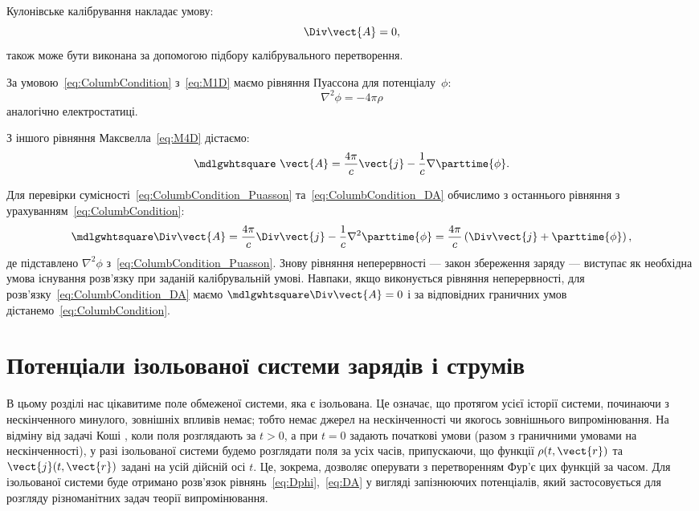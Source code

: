 Кулонівське калібрування накладає умову:
\begin{equation}\label{eq:ColumbCondition}
	\Div \vect{A} = 0,
\end{equation}
також може бути виконана за допомогою підбору калібрувального
перетворення.

За умовою~\eqref{eq:ColumbCondition} з~\eqref{eq:M1D} маємо рівняння Пуассона для потенціалу~$\phi$:
\begin{equation}\label{eq:ColumbCondition_Puasson}
	\nabla^2 \phi = -4\pi \rho
\end{equation}
аналогічно електростатиці.

З іншого рівняння Максвелла~\eqref{eq:M4D} дістаємо:
\begin{equation}\label{eq:ColumbCondition_DA}
	\mdlgwhtsquare\ \vect{A} = \frac{4\pi}c \vect{j} - \frac1c \nabla \parttime{\phi}.
\end{equation}

Для перевірки сумісності~\eqref{eq:ColumbCondition_Puasson} та~\eqref{eq:ColumbCondition_DA} обчислимо з останнього рівняння з
урахуванням~\eqref{eq:ColumbCondition}:
\begin{equation*}
	\mdlgwhtsquare\Div\vect{A} = \frac{4\pi}c \Div\vect{j} - \frac1c \nabla^2 \parttime{\phi} = \frac{4\pi}c\left( \Div\vect{j} +
	\parttime{\phi}\right),
\end{equation*}
де підставлено $\nabla^2\phi$ з~\eqref{eq:ColumbCondition_Puasson}. Знову рівняння неперервності --- закон збереження
заряду --- виступає як необхідна умова існування розв’язку при заданій
калібрувальній умові. Навпаки, якщо виконується рівняння неперервності, для
розв’язку~\eqref{eq:ColumbCondition_DA} маємо $\mdlgwhtsquare\Div\vect{A} = 0$ і за відповідних граничних умов
дістанемо~\eqref{eq:ColumbCondition}.

\section{Потенціали ізольованої системи зарядів і струмів}



В цьому розділі нас цікавитиме поле обмеженої системи, яка є ізольована. Це означає, що протягом усієї історії системи, починаючи з нескінченного
минулого, зовнішніх впливів немає; тобто немає джерел на нескінченності чи якогось зовнішнього випромінювання. На відміну від задачі Коші , коли поля
розглядають за $t >0$, а при $t =0$ задають початкові умови (разом з граничними умовами на нескінченності), у разі ізольованої системи будемо розглядати
поля за усіх часів, припускаючи, що функції $\rho(t, \vect{r})$ та $\vect{j}(t, \vect{r})$ задані на усій дійсній осі $t$. Це, зокрема, дозволяє
оперувати з перетворенням Фур’є цих функцій за часом. Для ізольованої системи буде отримано розв’язок рівнянь~\eqref{eq:Dphi},~\eqref{eq:DA} у вигляді
запізнюючих потенціалів, який застосовується для розгляду різноманітних задач теорії випромінювання.


